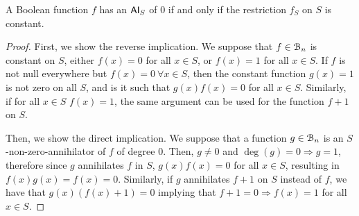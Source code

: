 \documentclass[11pt]{llncs}
\begin{document}
\begin{proposition}\label{prop:constantFs}
	A Boolean function $f$ has an $\mathsf{AI}_S$ of $0$ if and only if the restriction $f_S$ on $S$ is constant.
\end{proposition}
\begin{proof}
	First, we show the reverse implication.
	We suppose that $f\in \mathcal{B}_n$ is constant on $S$, either $f(x) = 0$ for all $x\in S$, or $f(x) = 1$ for all $x\in S$.
	If $f$ is not null everywhere but $f(x) = 0\ \forall x \in  S$, then the constant function $g(x) = 1$ is not zero on all $S$, and is it such that $g(x)f(x) = 0$ for all $x\in S$. 
	Similarly, if for all $x\in S$ $f(x) = 1$, the same argument can be used for the function $f+ 1$ on $S$.
	
	Then, we show the direct implication.
	We suppose that a function $g\in \mathcal{B}_n$ is an $S$-non-zero-annihilator of $f$ of degree $0$. Then,
	$g \neq 0$ and $\deg(g) = 0 \Rightarrow g = 1$, therefore since $g$ annihilates $f$ in $S$,  $g(x) f(x) = 0$ for all $x \in S$, resulting in $f(x)g(x) = f(x) = 0$.
	Similarly, if $g$ annihilates $f+ 1$ on $S$ instead of $f$, we have that $g(x)(f(x) + 1) = 0$ implying that $f+ 1 = 0 \Rightarrow f(x) = 1$ for all $x\in S$. 
\end{proof}
\end{document}

